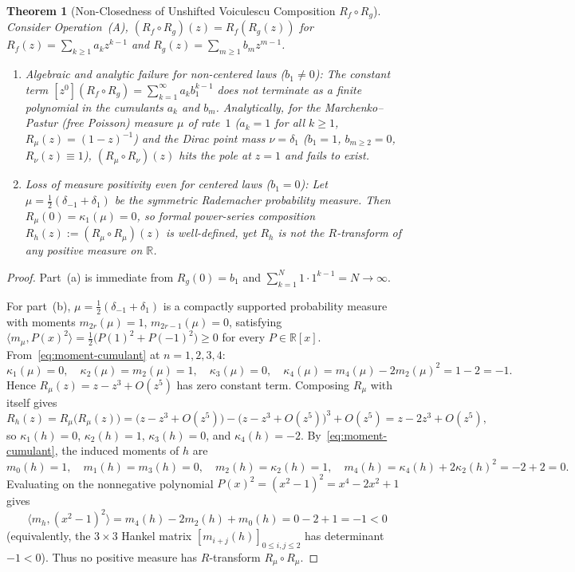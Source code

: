 \documentclass[11pt]{article}
\newtheorem{theorem}{Theorem}[section]
\theoremstyle{definition}
\begin{document}
\begin{theorem}[Non-Closedness of Unshifted Voiculescu Composition $R_f \circ R_g$]\label{thm:opA}
Consider Operation~(A), $(R_f \circ R_g)(z) = R_f(R_g(z))$ for $R_f(z) = \sum_{k \ge 1} a_k z^{k-1}$ and $R_g(z) = \sum_{m \ge 1} b_m z^{m-1}$.
\begin{enumerate}
  \item[(a)] \emph{Algebraic and analytic failure for non-centered laws ($b_1 \neq 0$):} The constant term $[z^0](R_f \circ R_g) = \sum_{k=1}^{\infty} a_k b_1^{k-1}$ does not terminate as a finite polynomial in the cumulants $a_k$ and $b_m$. Analytically, for the Marchenko--Pastur (free Poisson) measure $\mu$ of rate~$1$ ($a_k = 1$ for all $k \ge 1$, $R_\mu(z) = (1-z)^{-1}$) and the Dirac point mass $\nu = \delta_1$ ($b_1 = 1$, $b_{m \ge 2} = 0$, $R_\nu(z) \equiv 1$), $(R_\mu \circ R_\nu)(z)$ hits the pole at $z = 1$ and fails to exist.
  \item[(b)] \emph{Loss of measure positivity even for centered laws ($b_1 = 0$):} Let $\mu = \frac{1}{2}(\delta_{-1} + \delta_1)$ be the symmetric Rademacher probability measure. Then $R_\mu(0) = \kappa_1(\mu) = 0$, so formal power-series composition $R_h(z) := (R_\mu \circ R_\mu)(z)$ is well-defined, yet $R_h$ is \emph{not} the $R$-transform of any positive measure on $\mathbb{R}$.
\end{enumerate}
\end{theorem}
\begin{proof}
Part~(a) is immediate from $R_g(0) = b_1$ and $\sum_{k=1}^{N} 1 \cdot 1^{k-1} = N \to \infty$.

For part~(b), $\mu = \frac{1}{2}(\delta_{-1} + \delta_1)$ is a compactly supported probability measure with moments $m_{2r}(\mu) = 1$, $m_{2r-1}(\mu) = 0$, satisfying $\langle m_\mu, P(x)^2\rangle = \frac{1}{2}\bigl(P(1)^2 + P(-1)^2\bigr) \ge 0$ for every $P \in \mathbb{R}[x]$. From~\eqref{eq:moment-cumulant} at $n = 1,2,3,4$:
\[
  \kappa_1(\mu) = 0, \quad
  \kappa_2(\mu) = m_2(\mu) = 1, \quad
  \kappa_3(\mu) = 0, \quad
  \kappa_4(\mu) = m_4(\mu) - 2m_2(\mu)^2 = 1 - 2 = -1.
\]
Hence $R_\mu(z) = z - z^3 + O(z^5)$ has zero constant term. Composing $R_\mu$ with itself gives
\[
  R_h(z) = R_\mu\bigl(R_\mu(z)\bigr) = \bigl(z - z^3 + O(z^5)\bigr) - \bigl(z - z^3 + O(z^5)\bigr)^3 + O(z^5) = z - 2z^3 + O(z^5),
\]
so $\kappa_1(h) = 0$, $\kappa_2(h) = 1$, $\kappa_3(h) = 0$, and $\kappa_4(h) = -2$. By~\eqref{eq:moment-cumulant}, the induced moments of $h$ are
\[
  m_0(h) = 1, \quad m_1(h) = m_3(h) = 0, \quad m_2(h) = \kappa_2(h) = 1, \quad
  m_4(h) = \kappa_4(h) + 2\kappa_2(h)^2 = -2 + 2 = 0.
\]
Evaluating on the nonnegative polynomial $P(x)^2 = (x^2 - 1)^2 = x^4 - 2x^2 + 1$ gives
\[
  \bigl\langle m_h, (x^2 - 1)^2 \bigr\rangle = m_4(h) - 2m_2(h) + m_0(h) = 0 - 2 + 1 = -1 < 0
\]
(equivalently, the $3 \times 3$ Hankel matrix $[m_{i+j}(h)]_{0 \le i,j \le 2}$ has determinant $-1 < 0$). Thus no positive measure has $R$-transform $R_\mu \circ R_\mu$.
\end{proof}
\end{document}
